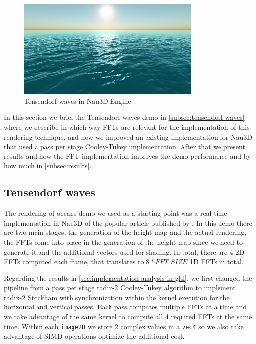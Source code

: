 \documentclass[
  oneside,
  11pt, a4paper,
  footinclude=true,
  headinclude=true,
  cleardoublepage=empty
]{scrbook}
\begin{document}
\begin{figure}[H] 
    \centering
    \includegraphics[width=0.8\textwidth]{img/ocean.png}
    \caption{Tensendorf waves in Nau3D Engine}
    \label{fig:tensendorf-waves-nau}
\end{figure}

In this section we brief the Tensendorf waves demo in \autoref{subsec:tensendorf-waves} where we describe in which way FFTs are relevant for the implementation of this rendering technique, and how we improved an existing implementation for Nau3D that used a pass per stage Cooley-Tukey implementation. After that we present results and how the FFT implementation improves the demo performance and by how much in \autoref{subsec:results}.

\subsection{Tensendorf waves} \label{subsec:tensendorf-waves}

The rendering of oceans demo we used as a starting point was a real time implementation in Nau3D of the popular article published by \cite{tessendorf2001simulating}. In this demo there are two main stages, the generation of the height map and the actual rendering, the FFTs come into place in the generation of the height map since we need to generate it and the additional vectors used for shading. In total, there are $4$ 2D FFTs computed each frame, that translates to $8*FFT\_SIZE$ 1D FFTs in total.
\newline 

Regarding the results in \autoref{sec:implementation-analysis-in-glsl}, we first changed the pipeline from a pass per stage radix-2 Cooley-Tukey algorithm to implement radix-2 Stockham with synchronization within the kernel execution for the horizontal and vertical passes. Each pass computes multiple FFTs at a time and we take advantage of the same kernel to compute all 4 required FFTs at the same time.  Within each \texttt{image2D} we store 2 complex values in a \texttt{vec4} so we also take advantage of SIMD operations optimize the additional cost. 
\end{document}

